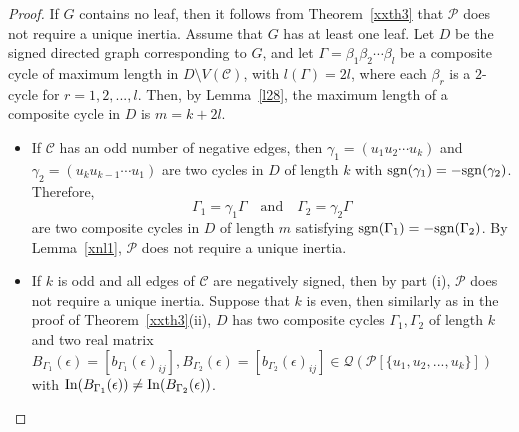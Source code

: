 \documentclass[a4paper, 10pt]{article}
\numberwithin{equation}{section}
\def\sgn{{\rm sgn}}
\def\In{{\rm In}}
\begin{document}
\begin{proof}
	If $G$ contains no leaf, then it follows from Theorem~\ref{xxth3} that $\mathcal{P}$ does not require a unique inertia. Assume that $G$ has at least one leaf. Let $D$ be the signed directed graph corresponding to $G$, and let $\Gamma=\beta_1\beta_2\cdots \beta_l$  be a composite cycle of maximum length in $D\setminus V(\mathcal{C})$, with $l(\Gamma)=2l$, where each $\beta_r$ is a $2$-cycle for $r=1,2,...,l$. Then, by Lemma~\ref{l28}, the maximum length of a composite cycle in $D$ is $m = k+2l$.
	\begin{itemize}
		\item[i.] If $\mathcal{C}$ has an odd number of negative edges, then $\gamma_1=(u_1u_2\cdots u_k)$ and $\gamma_2=(u_ku_{k-1}\cdots u_1)$ are two cycles in $D$ of length $k$ with $\sgn(\gamma_1)=-\sgn(\gamma_2)$. 
		Therefore, 
		$$
		\Gamma_1 = \gamma_1\Gamma \quad\text{and}\quad \Gamma_2 = \gamma_2\Gamma
		$$
		are two composite cycles in $D$ of length $m$ satisfying $\sgn(\Gamma_1)=-\sgn(\Gamma_2)$. 
		By Lemma~\ref{xnl1}, $\mathcal{P}$ does not require a unique inertia.
		
		\item[ii.] If $k$ is odd and all edges of $\mathcal{C}$ are negatively signed, then by part (i), $\mathcal{P}$ does not require a unique inertia. Suppose that $k$ is even, then similarly as in the proof of Theorem~\ref{xxth3}(ii), $D$ has two composite cycles
		$\Gamma_1,\Gamma_2$ of length $k$ and two real matrix $B_{\Gamma_1}(\epsilon) = [b_{\Gamma_1}(\epsilon)_{ij}],B_{\Gamma_2}(\epsilon) = [b_{\Gamma_2}(\epsilon)_{ij}] \in \mathcal{Q}(\mathcal{P}[\{u_1,u_2,...,u_k\}])$ with $\In(B_{\Gamma_1}(\epsilon))\neq \In(B_{\Gamma_2}(\epsilon))$.
		

\end{itemize}
\end{proof}
\end{document}
